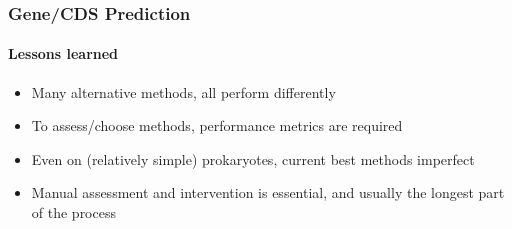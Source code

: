 \begin{frame}
   \frametitle{Gene/CDS Prediction}   
   \framesubtitle{Lessons learned}   
   \begin{itemize}
     \item Many alternative methods, all perform differently
     \item To assess/choose methods, performance metrics are required
     \item Even on (relatively simple) prokaryotes, current best methods imperfect
     \item Manual assessment and intervention is essential, and usually the longest part of the process
   \end{itemize}
\end{frame}